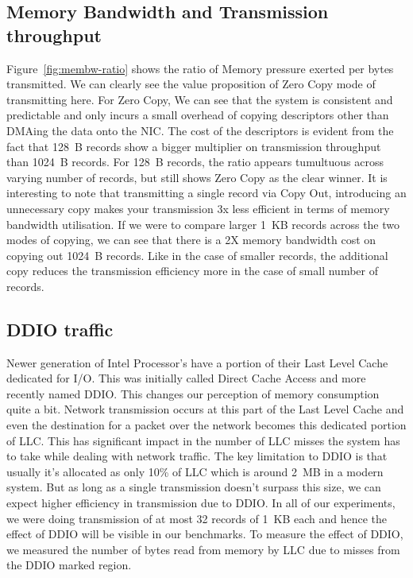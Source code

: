 \subsection{Memory Bandwidth and Transmission throughput}
\label{sec:membw-savings}
Figure~\ref{fig:membw-ratio} shows the ratio of Memory pressure exerted per bytes transmitted. We can clearly see the value proposition of 
Zero Copy mode of transmitting here. For Zero Copy, We can see that the system is consistent and predictable and only incurs a small overhead of 
copying descriptors other than DMAing the data onto the NIC. The cost of the descriptors is evident from the fact that 128~B records show 
a bigger multiplier on transmission throughput than 1024~B records. For 128~B records, the ratio appears tumultuous across varying number of records, 
 but still shows Zero Copy as the clear winner. It is interesting to note that transmitting a single record via Copy Out, 
 introducing an unnecessary copy makes your transmission 3x less efficient in terms of memory bandwidth utilisation.
  If we were to compare larger 1~KB records across the two modes of copying, we can see that there is a 
 2X memory bandwidth cost on copying out 1024~B records. Like in the case of smaller records, the additional copy reduces the 
 transmission efficiency more in the case of small number of records.




\subsection{DDIO traffic}
Newer generation of Intel Processor's have a portion of their Last Level Cache dedicated for I/O. This was initially called Direct Cache Access 
and more recently named DDIO. This changes our perception of memory consumption quite a bit. Network transmission occurs at this part of the Last Level Cache 
and even the destination for a packet over the network becomes this dedicated portion of LLC. This has significant impact in the number of LLC misses the system 
has to take while dealing with network traffic. The key limitation to DDIO is that usually it's allocated as only 10\% of LLC which is around 2~MB in a modern system. 
But as long as a single transmission doesn't surpass this size, we can expect higher efficiency in transmission due to DDIO. In all of our experiments, we were doing transmission of 
at most 32 records of 1~KB each and hence the effect of DDIO will be visible in our benchmarks. To measure the 
effect of DDIO, we measured the number of bytes read from memory by LLC due to misses from the DDIO marked region. 

